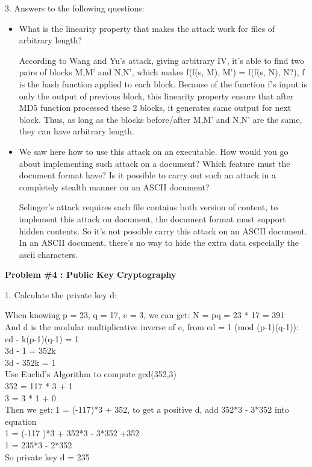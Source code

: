 \documentclass[12pt]{article}  %
\begin{document}
3. Answers to the following questions:
\begin{itemize}
      \item What is the linearity property that makes the attack work for files of arbitrary length?

      According to Wang and Yu's attack, giving arbitrary IV, it's able to find two pairs of blocks M,M' and N,N', which makes f(f(s, M), M') = f(f(s, N), N?), f is the hash function applied to each block. Because of the function f's input is only the output of previous block, this linearity property ensure that after MD5 function processed these 2 blocks, it generates same output for next block. Thus, as long as the blocks before/after M,M' and N,N' are the same, they can have arbitrary length.
          
      \item We saw here how to use this attack on an executable. How would you go about implementing such attack on a document? Which feature must the document format have? Is it possible to carry out such an attack in a completely stealth manner on an ASCII document?

     Selinger's attack requires each file contains both version of content, to implement this attack on document, the document format must support hidden contents. So it's not possible carry this attack on an ASCII document. In an ASCII document, there's no way to hide the extra data especially the ascii characters.
\end{itemize}
\newpage
\begin{center}
\textbf{Problem \#4 : Public Key Cryptography}
\end{center}

1. Calculate the private key d:

When knowing p = 23, q = 17, e = 3, we can get: N = pq = 23 * 17 = 391\\
And d is the modular multiplicative inverse of e, from ed = 1 (mod (p-1)(q-1)):\\
ed - k(p-1)(q-1) = 1\\
3d - 1 = 352k\\
3d - 352k = 1\\
Use Euclid's Algorithm to compute gcd(352,3)\\
352 = 117 * 3 + 1\\
3 = 3 * 1 + 0\\
Then we get: 1 = (-117)*3 + 352, to get a positive d, add 352*3 - 3*352 into equation\\
1 = (-117 )*3 + 352*3 - 3*352 +352\\
1 = 235*3 - 2*352\\
So private key d = 235\\
\end{document}
